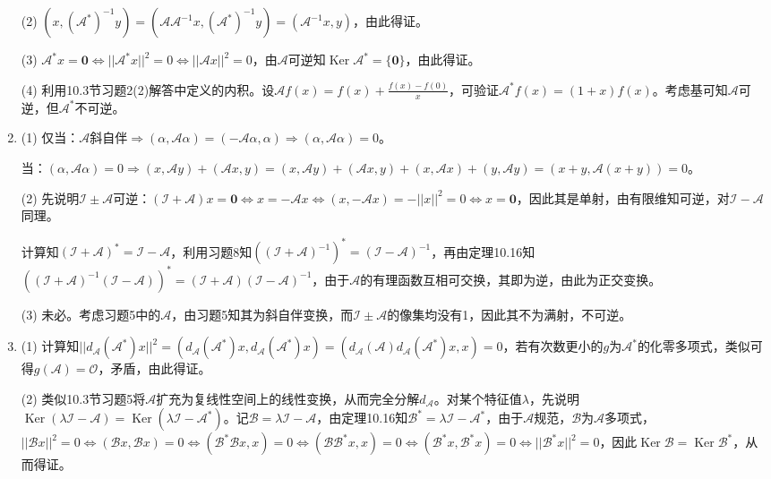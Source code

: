 \documentclass[a4paper,UTF8,fontset=windows]{ctexart}
\DeclareMathOperator{\Ker}{Ker}
\begin{document}
\begin{enumerate}
(2) $(x,(\mathcal{A}^*)^{-1}y)=(\mathcal{A}\mathcal{A}^{-1}x,(\mathcal{A}^*)^{-1}y)=(\mathcal{A}^{-1}x,y)$，由此得证。

(3) $\mathcal{A}^*x=\mathbf{0}\Leftrightarrow||\mathcal{A}^*x||^2=0\Leftrightarrow||\mathcal{A}x||^2=0$，由$\mathcal{A}$可逆知$\Ker\mathcal{A}^*=\{\mathbf{0}\}$，由此得证。

(4) 利用10.3节习题2(2)解答中定义的内积。设$\mathcal{A}f(x)=f(x)+\frac{f(x)-f(0)}{x}$，可验证$\mathcal{A}^*f(x)=(1+x)f(x)$。考虑基可知$\mathcal{A}$可逆，但$\mathcal{A}^*$不可逆。


\item
(1) 仅当：$\mathcal{A}$斜自伴$\Rightarrow(\alpha,\mathcal{A}\alpha)=(-\mathcal{A}\alpha,\alpha)\Rightarrow(\alpha,\mathcal{A}\alpha)=0$。

当：$(\alpha,\mathcal{A}\alpha)=0\Rightarrow(x,\mathcal{A}y)+(\mathcal{A}x,y)=(x,\mathcal{A}y)+(\mathcal{A}x,y)+(x,\mathcal{A}x)+(y,\mathcal{A}y)=(x+y,\mathcal{A}(x+y))=0$。

(2) 先说明$\mathcal{I}\pm\mathcal{A}$可逆：$(\mathcal{I}+\mathcal{A})x=\mathbf{0}\Leftrightarrow x=-\mathcal{A}x\Leftrightarrow(x,-\mathcal{A}x)=-||x||^2=0\Leftrightarrow x=\mathbf{0}$，因此其是单射，由有限维知可逆，对$\mathcal{I}-\mathcal{A}$同理。

计算知$(\mathcal{I}+\mathcal{A})^*=\mathcal{I}-\mathcal{A}$，利用习题8知$((\mathcal{I}+\mathcal{A})^{-1})^*=(\mathcal{I}-\mathcal{A})^{-1}$，再由定理10.16知$((\mathcal{I}+\mathcal{A})^{-1}(\mathcal{I}-\mathcal{A}))^*=(\mathcal{I}+\mathcal{A})(\mathcal{I}-\mathcal{A})^{-1}$，由于$\mathcal{A}$的有理函数互相可交换，其即为逆，由此为正交变换。

(3) 未必。考虑习题5中的$\mathcal{A}$，由习题5知其为斜自伴变换，而$\mathcal{I}\pm\mathcal{A}$的像集均没有1，因此其不为满射，不可逆。

\item
(1) 计算知$||d_\mathcal{A}(\mathcal{A}^*)x||^2=(d_\mathcal{A}(\mathcal{A}^*)x,d_\mathcal{A}(\mathcal{A}^*)x)=(d_\mathcal{A}(\mathcal{A})d_\mathcal{A}(\mathcal{A}^*)x,x)=0$，若有次数更小的$g$为$\mathcal{A}^*$的化零多项式，类似可得$g(\mathcal{A})=\mathcal{O}$，矛盾，由此得证。

(2) 类似10.3节习题5将$\mathcal{A}$扩充为复线性空间上的线性变换，从而完全分解$d_\mathcal{A}$。对某个特征值$\lambda$，先说明$\Ker(\lambda\mathcal{I}-\mathcal{A})=\Ker(\lambda\mathcal{I}-\mathcal{A}^*)$。记$\mathcal{B}=\lambda\mathcal{I}-\mathcal{A}$，由定理10.16知$\mathcal{B}^*=\lambda\mathcal{I}-\mathcal{A}^*$，由于$\mathcal{A}$规范，$\mathcal{B}$为$\mathcal{A}$多项式，$||\mathcal{B}x||^2=0\Leftrightarrow(\mathcal{B}x,\mathcal{B}x)=0\Leftrightarrow(\mathcal{B}^*\mathcal{B}x,x)=0\Leftrightarrow(\mathcal{B}\mathcal{B}^*x,x)=0\Leftrightarrow(\mathcal{B}^*x,\mathcal{B}^*x)=0\Leftrightarrow||\mathcal{B}^*x||^2=0$，因此$\Ker\mathcal{B}=\Ker\mathcal{B}^*$，从而得证。


\end{enumerate}
\end{document}
